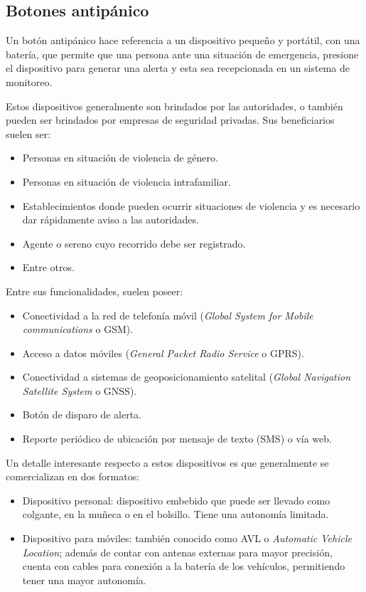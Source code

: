 \subsection{Botones antipánico}

Un botón antipánico hace referencia a un dispositivo pequeño y portátil, con una batería, que permite que una persona ante una situación de emergencia, presione el dispositivo para generar una alerta y esta sea recepcionada en un sistema de monitoreo.

Estos dispositivos generalmente son brindados por las autoridades, o también pueden ser brindados por empresas de seguridad privadas. Sus beneficiarios suelen ser:
\begin{itemize}
\item Personas en situación de violencia de género.	
\item Personas en situación de violencia intrafamiliar.
\item Establecimientos donde pueden ocurrir situaciones de violencia y es necesario dar rápidamente aviso a las autoridades.
\item Agente o sereno cuyo recorrido debe ser registrado.
\item Entre otros.
\end{itemize}

Entre sus funcionalidades, suelen poseer:
\begin{itemize}
\item Conectividad a la red de telefonía móvil (\textit{Global System for Mobile communications} o GSM).
\item Acceso a datos móviles (\textit{General Packet Radio Service} o GPRS).
\item Conectividad a sistemas de geoposicionamiento satelital (\textit{Global Navigation Satellite System} o GNSS).
\item Botón de disparo de alerta.
\item Reporte periódico de ubicación por mensaje de texto (SMS) o vía web.
\end{itemize}

Un detalle interesante respecto a estos dispositivos es que generalmente se comercializan en dos formatos:

\begin{itemize}
\item Dispositivo personal: dispositivo embebido que puede ser llevado como colgante, en la muñeca o en el bolsillo. Tiene una autonomía limitada.
\item Dispositivo para móviles: también conocido como AVL o \textit{Automatic Vehicle Location}; además de contar con antenas externas para mayor precisión, cuenta con cables para conexión a la batería de los vehículos, permitiendo tener una mayor autonomía.
\end{itemize}


